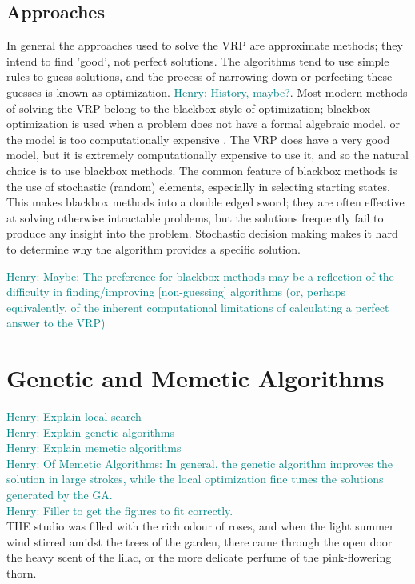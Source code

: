 \documentclass{sig-alternate}
\newcommand{\allcomments}[1]{{#1}}
\newcommand{\hfcomment}[1]{\textcolor{Teal}{\allcomments{Henry: {#1}}}}
\begin{document}
{\subsection{Approaches}
In general the approaches used to solve the VRP are approximate methods; they intend to find 'good', not perfect solutions. The algorithms tend to use simple rules to guess solutions, and the process of narrowing down or perfecting these guesses is known as optimization. \hfcomment{History, maybe?}. Most modern methods of solving the VRP belong to the blackbox style of optimization; blackbox optimization is used when a problem does not have a formal algebraic model, or the model is too computationally expensive \cite{Amaran:2014}. The VRP does have a very good model, but it is extremely computationally expensive to use it, and so the natural choice is to use blackbox methods. The common feature of blackbox methods is the use of stochastic (random) elements, especially in selecting starting states. This makes blackbox methods into a double edged sword; they are often effective at solving otherwise intractable problems, but the solutions frequently fail to produce any insight into the problem. Stochastic decision making makes it hard to determine why the algorithm provides a specific solution. 

\hfcomment{Maybe: The preference for blackbox methods may be a reflection of the difficulty in finding/improving [non-guessing] algorithms (or, perhaps equivalently, of the inherent computational limitations of calculating a perfect answer to the VRP)}

\section{Genetic and Memetic Algorithms}
\hfcomment{Explain local search}\\
\hfcomment{Explain genetic algorithms}\\
\hfcomment{Explain memetic algorithms}\\
\hfcomment{Of Memetic Algorithms: In general, the genetic algorithm improves the solution in large strokes, while the local optimization fine tunes the solutions generated by the GA. }\\
\hfcomment{Filler to get the figures to fit correctly.}\\
THE studio was filled with the rich odour of roses, 
and when the light summer wind stirred amidst 
the trees of the garden, there came through the open 
door the heavy scent of the lilac, or the more delicate 
perfume of the pink-flowering thorn. 

}
\end{document}
